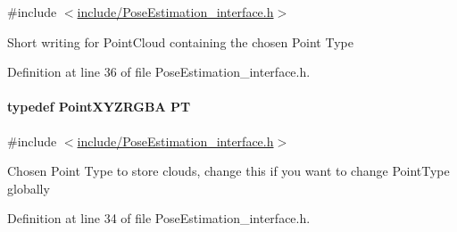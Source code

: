 {\ttfamily \#include $<$\hyperlink{PoseEstimation__interface_8h}{include/\-Pose\-Estimation\-\_\-interface.\-h}$>$}

Short writing for Point\-Cloud containing the chosen Point Type 

Definition at line 36 of file Pose\-Estimation\-\_\-interface.\-h.

\hypertarget{group__Definitions_ga102df08e7bbccbe3fa6e0b53fd9bac74}{
\paragraph[{P\-T}]{\setlength{\rightskip}{0pt plus 5cm}typedef Point\-X\-Y\-Z\-R\-G\-B\-A {\bf P\-T}}}\label{group__Definitions_ga102df08e7bbccbe3fa6e0b53fd9bac74}


{\ttfamily \#include $<$\hyperlink{PoseEstimation__interface_8h}{include/\-Pose\-Estimation\-\_\-interface.\-h}$>$}

Chosen Point Type to store clouds, change this if you want to change Point\-Type globally 

Definition at line 34 of file Pose\-Estimation\-\_\-interface.\-h.

